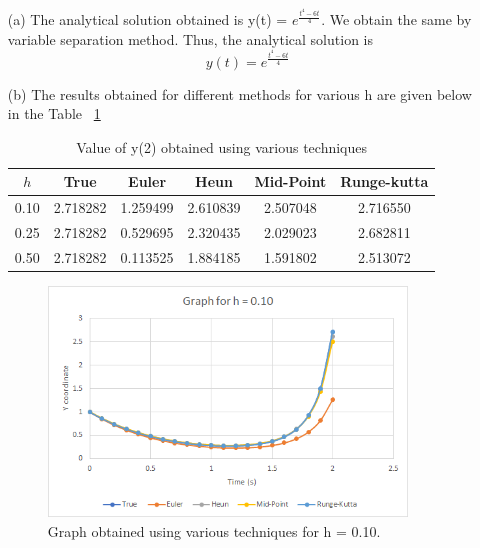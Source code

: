 \documentclass[titlepage, 11pt]{article}
\begin{document}
\begin{itemize}
    \item [(a)] The analytical solution obtained is y(t) = $e^{\frac{t^4-6t}{4}}$. We obtain the same by variable separation method. Thus, the analytical solution is 
    \begin{equation}
        y(t) = e^{\frac{t^4-6t}{4}}
    \end{equation}
    \item [(b)] The results obtained for different methods for various h are given below in the Table ~\ref{tab:table2}
    \begin{table}[!htb]
    \caption{Value of y(2) obtained using various techniques}
    \centering
    \begin{tabular}{c|c|cccc}
    \toprule
    \textbf{$h$}& \textbf{True} & \textbf{Euler}& \textbf{Heun}  & \textbf{Mid-Point} & \textbf{Runge-kutta} \\
    \midrule
         0.10 & 2.718282 & 1.259499 &	2.610839	&2.507048 &	2.716550 \\
         0.25 & 2.718282 &	0.529695 &	2.320435 &	2.029023 &	2.682811 \\
         0.50 & 2.718282 &	0.113525 &	1.884185 &	1.591802 &	2.513072 \\
    \bottomrule
    \end{tabular}
    \label{tab:table2}
\end{table}
\begin{figure}[!tbh]
  	\centering
  	\includegraphics[width=0.9\textwidth]{G0.1.png} 
  	\caption{Graph obtained using various techniques for h = 0.10.}
  	\label{fig:q111a} 
\end{figure}
\begin{figure}[!tbh]
  	\centering

\end{figure}
\end{itemize}
\end{document}
